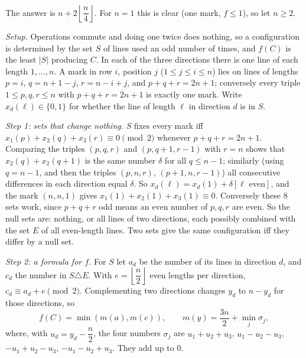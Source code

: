 The answer is $n+2\left\lfloor\dfrac n4\right\rfloor$. For $n=1$ this is clear (one mark, $f\le1$), so let $n\ge2$.

\emph{Setup.} Operations commute and doing one twice does nothing, so a configuration is determined by the set $S$ of lines used an odd number of times, and $f(C)$ is the least $|S|$ producing $C$. In each of the three directions there is one line of each length $1,\dots,n$. A mark in row $i$, position $j$ ($1\le j\le i\le n$) lies on lines of lengths $p=i$, $q=n+1-j$, $r=n-i+j$, and $p+q+r=2n+1$; conversely every triple $1\le p,q,r\le n$ with $p+q+r=2n+1$ is exactly one mark. Write $x_d(\ell)\in\{0,1\}$ for whether the line of length $\ell$ in direction $d$ is in $S$.

\emph{Step 1: sets that change nothing.} $S$ fixes every mark iff $x_1(p)+x_2(q)+x_3(r)\equiv0\pmod2$ whenever $p+q+r=2n+1$. Comparing the triples $(p,q,r)$ and $(p,q+1,r-1)$ with $r=n$ shows that $x_2(q)+x_2(q+1)$ is the same number $\delta$ for all $q\le n-1$; similarly (using $q=n-1$, and then the triples $(p,n,r)$, $(p+1,n,r-1)$) all consecutive differences in each direction equal $\delta$. So $x_d(\ell)=x_d(1)+\delta[\ell\text{ even}]$, and the mark $(n,n,1)$ gives $x_1(1)+x_2(1)+x_3(1)\equiv0$. Conversely these $8$ sets work, since $p+q+r$ odd means an even number of $p,q,r$ are even. So the null sets are: nothing, or all lines of two directions, each possibly combined with the set $E$ of all even-length lines. Two sets give the same configuration iff they differ by a null set.

\emph{Step 2: a formula for $f$.} For $S$ let $a_d$ be the number of its lines in direction $d$, and $c_d$ the number in $S\triangle E$. With $e=\left\lfloor\dfrac n2\right\rfloor$ even lengths per direction, $c_d\equiv a_d+e\pmod2$. Complementing two directions changes $y_d$ to $n-y_d$ for those directions, so
\[f(C)=\min\left(m(a),m(c)\right),\qquad m(y)=\dfrac{3n}{2}+\min_j\sigma_j,\]
where, with $u_d=y_d-\dfrac n2$, the four numbers $\sigma_j$ are $u_1+u_2+u_3$, $u_1-u_2-u_3$, $-u_1+u_2-u_3$, $-u_1-u_2+u_3$. They add up to $0$.


